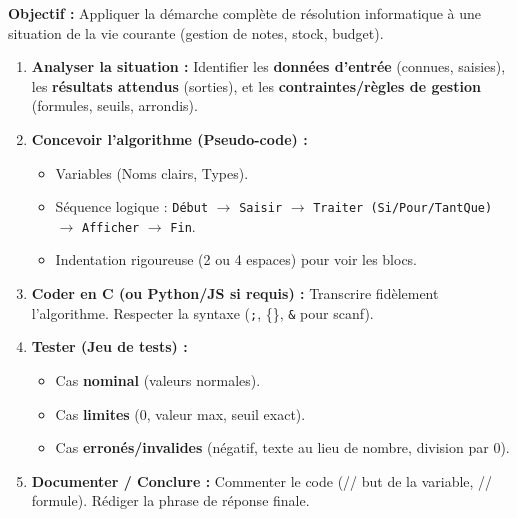 \documentclass[11pt]{article}
\begin{document}
\begin{methode}
    \textbf{Objectif :} Appliquer la démarche complète de résolution informatique à une situation de la vie courante (gestion de notes, stock, budget).
    \begin{enumerate}
        \item \textbf{Analyser la situation :} Identifier les \textbf{données d'entrée} (connues, saisies), les \textbf{résultats attendus} (sorties), et les \textbf{contraintes/règles de gestion} (formules, seuils, arrondis).
        \item \textbf{Concevoir l'algorithme (Pseudo-code) :} 
        \begin{itemize}
            \item Variables (Noms clairs, Types).
            \item Séquence logique : \texttt{Début} $\to$ \texttt{Saisir} $\to$ \texttt{Traiter (Si/Pour/TantQue)} $\to$ \texttt{Afficher} $\to$ \texttt{Fin}.
            \item Indentation rigoureuse (2 ou 4 espaces) pour voir les blocs.
        \end{itemize}
        \item \textbf{Coder en C (ou Python/JS si requis) :} Transcrire fidèlement l'algorithme. Respecter la syntaxe (\texttt{;}, \{\}, \texttt{\&} pour scanf).
        \item \textbf{Tester (Jeu de tests) :} 
        \begin{itemize}
            \item Cas \textbf{nominal} (valeurs normales).
            \item Cas \textbf{limites} (0, valeur max, seuil exact).
            \item Cas \textbf{erronés/invalides} (négatif, texte au lieu de nombre, division par 0).
        \end{itemize}
        \item \textbf{Documenter / Conclure :} Commenter le code (// but de la variable, // formule). Rédiger la phrase de réponse finale.
    \end{enumerate}
\end{methode}
\end{document}
